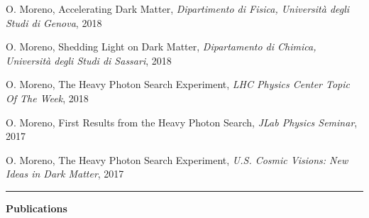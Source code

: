 \documentclass[11pt]{article}
\newcommand{\cvsection}[1] {
    \noindent
    \textcolor{indigodye}{\rule{.15\textwidth}{.1in} \hspace{0.01 \textwidth} \textbf{\Large{#1}}} \newline 
}
\begin{document}
    \noindent
    [3] O. Moreno, Accelerating Dark Matter,
        \emph{Dipartimento di Fisica, Università degli Studi di Genova}, 2018 

    \noindent
    [4] O. Moreno, Shedding Light on Dark Matter, 
        \emph{Dipartamento di Chimica, Università degli Studi di Sassari}, 2018  

    \noindent
    [5] O. Moreno, The Heavy Photon Search Experiment, 
        \emph{LHC Physics Center Topic Of The Week}, 2018 

    \noindent
    [6] O. Moreno, First Results from the Heavy Photon Search, 
        \emph{JLab Physics Seminar}, 2017 
    
    \noindent
    [7] O. Moreno, The Heavy Photon Search Experiment, 
        \emph{U.S. Cosmic Visions: New Ideas in Dark Matter}, 2017 \\

    \cvsection{Publications}
    \vspace{-22pt}
\end{document}

